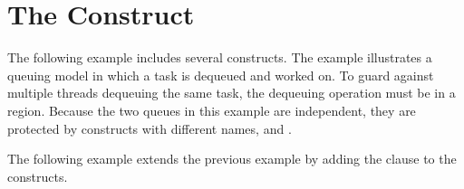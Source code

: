 \pagebreak
\chapter{The  Construct}
\label{chap:critical}

The following example includes several  constructs. The example 
illustrates a queuing model in which a task is dequeued and worked on. To guard 
against multiple threads dequeuing the same task, the dequeuing operation must 
be in a  region. Because the two queues in this example are independent, 
they are protected by  constructs with different names,  
and .



The following example extends the previous example by adding the  clause to the  constructs.


